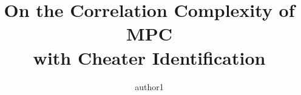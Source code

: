 \documentclass[18pt]{beamer}
\title{On the Correlation Complexity of MPC\\with Cheater Identification}
\author{\vspace*{-1cm}}
\institute{\vspace*{-1cm}}
\author{
        author1\inst{1}
        \phantom{\thanks{
            Footnote...
        }}
    }
\institute{
        Institute
        \email{e@mail.com}
    }
\begin{document}

\normalfont
\vspace*{-1cm}

\begin{frame}
    \titlepage
\end{frame}





\appendix


\end{document}
